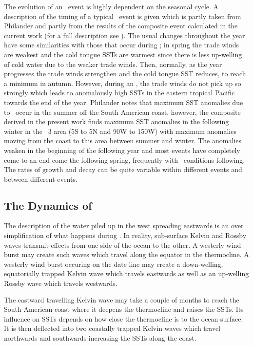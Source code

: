 The evolution of an \elnino\ event is highly dependent on the seasonal
cycle. A description of the timing of a typical \elnino\ event is
given which is partly taken from Philander \cite{Phi90} and partly
from the results of the composite event calculated in the current work
(for a full description see \cite{Spe00}). The usual changes
throughout the year have some similarities with those that occur
during \elnino ; in spring the trade winds are weakest and the cold
tongue SSTs are warmest since there is less up-welling of cold water
due to the weaker trade winds. Then, normally, as the year progresses
the trade winds strengthen and the cold tongue SST reduces, to reach a
minimum in autumn. However, during an \elnino , the trade winds do not
pick up so strongly which leads to anomalously high SSTs in the
eastern tropical Pacific towards the end of the year. Philander
\cite{Phi90} notes that maximum SST anomalies due to \elnino\ occur in
the summer off the South American coast, however, the composite
derived in the present work finds maximum SST anomalies in the
following winter in the \nino\ 3 area (5\de S to 5\de N and 90\de W to
150\de W) with maximum anomalies moving from the coast to this area
between summer and winter. The anomalies weaken in the beginning of
the following year and most events have completely come to an end come
the following spring, frequently with \lanina\ conditions
following. The rates of growth and decay can be quite 
variable within different events and between different events. 

\subsection{The Dynamics of \elnino }

The description of the water piled up in the west spreading eastwards
is an over simplification of what happens during \elnino. In reality,
sub-surface Kelvin and Rossby 
waves transmit effects from one side of the ocean to the other. A
westerly wind burst may create such waves which travel along the
equator in the thermocline. A westerly wind burst occuring on the date
line may create a down-welling, equatorially trapped Kelvin wave which
travels eastwards as well as an up-welling Rossby wave which travels
westwards. 

The eastward travelling Kelvin wave may take a couple of months to
reach the South American coast where it deepens the thermocline and
raises the SSTs. Its influence on SSTs depends on how close the
thermocline is to the ocean surface. It is then deflected into two
coastally trapped 
Kelvin waves which travel northwards and southwards increasing the
SSTs along the coast. 

